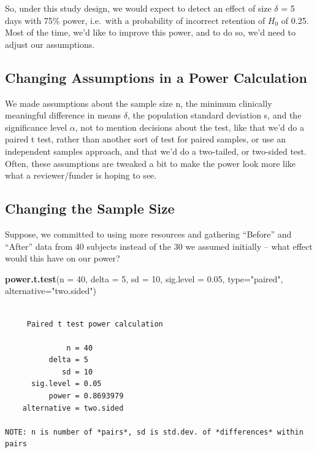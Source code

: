 \documentclass[
]{book}
\newenvironment{Shaded}{\begin{snugshade}}{\end{snugshade}}
\newcommand{\DataTypeTok}[1]{\textcolor[rgb]{0.13,0.29,0.53}{#1}}
\newcommand{\DecValTok}[1]{\textcolor[rgb]{0.00,0.00,0.81}{#1}}
\newcommand{\FloatTok}[1]{\textcolor[rgb]{0.00,0.00,0.81}{#1}}
\newcommand{\KeywordTok}[1]{\textcolor[rgb]{0.13,0.29,0.53}{\textbf{#1}}}
\newcommand{\NormalTok}[1]{#1}
\newcommand{\StringTok}[1]{\textcolor[rgb]{0.31,0.60,0.02}{#1}}
\begin{document}
So, under this study design, we would expect to detect an effect of size \(\delta\) = 5 days with 75\% power, i.e.~with a probability of incorrect retention of \(H_0\) of 0.25. Most of the time, we'd like to improve this power, and to do so, we'd need to adjust our assumptions.

\hypertarget{changing-assumptions-in-a-power-calculation}{%
\subsection{Changing Assumptions in a Power Calculation}\label{changing-assumptions-in-a-power-calculation}}

We made assumptions about the sample size n, the minimum clinically meaningful difference in means \(\delta\), the population standard deviation s, and the significance level \(\alpha\), not to mention decisions about the test, like that we'd do a paired t test, rather than another sort of test for paired samples, or use an independent samples approach, and that we'd do a two-tailed, or two-sided test. Often, these assumptions are tweaked a bit to make the power look more like what a reviewer/funder is hoping to see.

\hypertarget{changing-the-sample-size}{%
\subsection{Changing the Sample Size}\label{changing-the-sample-size}}

Suppose, we committed to using more resources and gathering ``Before'' and ``After'' data from 40 subjects instead of the 30 we assumed initially -- what effect would this have on our power?

\begin{Shaded}
\begin{Highlighting}[]
\KeywordTok{power.t.test}\NormalTok{(}\DataTypeTok{n =} \DecValTok{40}\NormalTok{, }\DataTypeTok{delta =} \DecValTok{5}\NormalTok{, }\DataTypeTok{sd =} \DecValTok{10}\NormalTok{, }\DataTypeTok{sig.level =} \FloatTok{0.05}\NormalTok{, }
             \DataTypeTok{type=}\StringTok{"paired"}\NormalTok{, }\DataTypeTok{alternative=}\StringTok{"two.sided"}\NormalTok{)}
\end{Highlighting}
\end{Shaded}

\begin{verbatim}

     Paired t test power calculation 

              n = 40
          delta = 5
             sd = 10
      sig.level = 0.05
          power = 0.8693979
    alternative = two.sided

NOTE: n is number of *pairs*, sd is std.dev. of *differences* within pairs
\end{verbatim}
\end{document}
